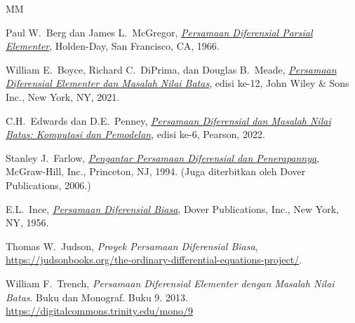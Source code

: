 \documentclass[12pt]{book}
\begin{document}
\begin{thebibliography}{MM}


\label{furtherreading:chapter}

 Paul W.\ Berg dan James L.\ McGregor, 
 \emph{\href{https://books.google.com/books?id=EfJQAAAAMAAJ}{Persamaan
Diferensial Parsial Elementer}}, 
 Holden-Day,
 San Francisco, CA\@,
 1966.

 William E.\ Boyce, 
 Richard C.\ DiPrima,
 dan Douglas B.\ Meade,
 \emph{\href{https://books.google.com/books?id=DX9zEAAAQBAJ}{Persamaan
Diferensial Elementer dan Masalah Nilai Batas}},
 edisi ke-12,
 John Wiley \& Sons Inc.,
 New York, NY\@, 2021.

 C.H.\ Edwards dan D.E.\ Penney,
 \emph{\href{https://books.google.com/books?id=GrNszwEACAAJ}{Persamaan
Diferensial dan Masalah Nilai Batas: Komputasi dan Pemodelan}},
 edisi ke-6,
 Pearson,
 2022.

 Stanley J.\ Farlow,
 \emph{\href{https://books.google.com/books?id=_ozWAAAAMAAJ}{Pengantar
Persamaan Diferensial dan Penerapannya}},
 McGraw-Hill, Inc.,
 Princeton, NJ\@,
 1994.  (Juga diterbitkan oleh Dover Publications, 2006.)

 E.L.\ Ince,
 \emph{\href{https://books.google.com/books?id=uYz-pqUD75gC}{Persamaan
Diferensial Biasa}},
 Dover Publications, Inc.,
 New York, NY\@,
 1956.

  Thomas W.\ Judson,
  \emph{Proyek Persamaan Diferensial Biasa},
  \url{https://judsonbooks.org/the-ordinary-differential-equations-project/}.

 William F.\ Trench,
 \emph{Persamaan Diferensial Elementer dengan Masalah Nilai
Batas}. Buku dan Monograf. Buku 9.  2013.
\url{https://digitalcommons.trinity.edu/mono/9}

\end{thebibliography}
\end{document}

